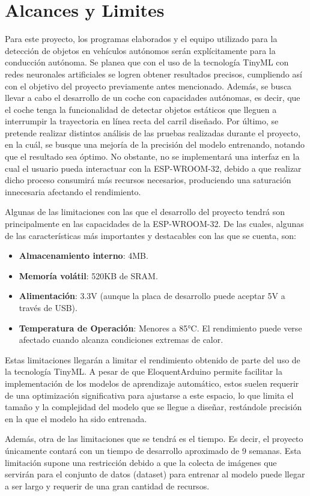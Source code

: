 \section{Alcances y Limites}
Para este proyecto, los programas elaborados y el equipo utilizado para la detección de objetos en vehículos autónomos serán explícitamente para la conducción autónoma. Se planea que con el uso de la tecnología TinyML con redes neuronales artificiales se logren obtener resultados precisos, cumpliendo así con el objetivo del proyecto previamente antes mencionado. Además, se busca llevar a cabo el desarrollo de un coche con capacidades autónomas, es decir, que el coche tenga la funcionalidad de detectar objetos estáticos que lleguen a interrumpir la trayectoria en línea recta del carril diseñado. Por último, se pretende realizar distintos análisis de las pruebas realizadas durante el proyecto, en la cuál, se busque una mejoría de la precisión del modelo entrenando, notando que el resultado sea óptimo. No obstante, no se implementará una interfaz en la cual el usuario pueda interactuar con la ESP-WROOM-32, debido a que realizar dicho proceso consumirá más recursos necesarios, produciendo una saturación innecesaria afectando el rendimiento.

Algunas de las limitaciones con las que el desarrollo del proyecto tendrá son principalmente en las capacidades de la ESP-WROOM-32. De las cuales, algunas de las características más importantes y destacables con las que se cuenta, son:
\begin{itemize}
    \item \textbf{Almacenamiento interno}: 4MB.
    \item \textbf{Memoría volátil}: 520KB de SRAM.
    \item \textbf{Alimentación}: 3.3V (aunque la placa de desarrollo puede aceptar 5V a través de USB).
    \item \textbf{Temperatura de Operación}: Menores a 85°C. El rendimiento puede verse afectado cuando alcanza condiciones extremas de calor.
\end{itemize}
Estas limitaciones llegarán a limitar el rendimiento obtenido de parte del uso de la tecnología TinyML. A pesar de que EloquentArduino permite facilitar la implementación de los modelos de aprendizaje automático, estos suelen requerir de una optimización significativa para ajustarse a este espacio, lo que limita el tamaño y la complejidad del modelo que se llegue a diseñar, restándole precisión en la que el modelo ha sido entrenada.

Además, otra de las limitaciones que se tendrá es el tiempo. Es decir, el proyecto únicamente contará con un tiempo de desarrollo aproximado de 9 semanas. Esta limitación supone una restricción debido a que la colecta de imágenes que servirán para el conjunto de datos (dataset) para entrenar al modelo puede llegar a ser largo y requerir de una gran cantidad de recursos. 
